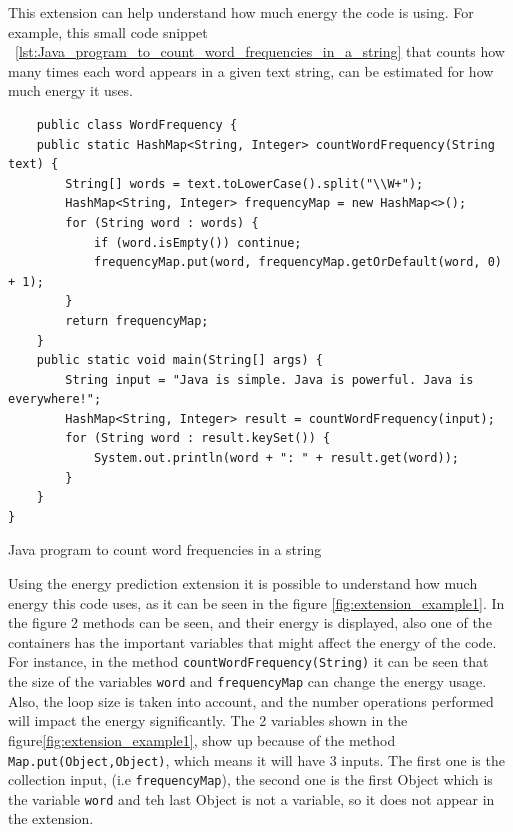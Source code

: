 This extension can help understand how much energy the code is using.
For example, this small code snippet ~\ref{lst:Java_program_to_count_word_frequencies_in_a_string} that counts how many times each word appears in a given text string, can be estimated for how much energy it uses.

\begin{listing}[H]
\begin{verbatim}
    public class WordFrequency {
    public static HashMap<String, Integer> countWordFrequency(String text) {
        String[] words = text.toLowerCase().split("\\W+");
        HashMap<String, Integer> frequencyMap = new HashMap<>();
        for (String word : words) {
            if (word.isEmpty()) continue; 
            frequencyMap.put(word, frequencyMap.getOrDefault(word, 0) + 1);
        }
        return frequencyMap;
    }
    public static void main(String[] args) {
        String input = "Java is simple. Java is powerful. Java is everywhere!";
        HashMap<String, Integer> result = countWordFrequency(input);
        for (String word : result.keySet()) {
            System.out.println(word + ": " + result.get(word));
        }
    }
}
\end{verbatim}
\caption{Java program to count word frequencies in a string}            
\label{lst:Java_program_to_count_word_frequencies_in_a_string}
\end{listing}

Using the energy prediction extension it is possible to understand how much energy this code uses, as it can be seen in the figure \ref{fig:extension_example1}.
In the figure 2 methods can be seen, and their energy is displayed, also one of the containers has the important variables that might affect the energy of the code. For instance, in the method \texttt{countWordFrequency(String)} it can be seen that the size of the variables \texttt{word} and \texttt{frequencyMap} can change the energy usage. Also, the loop size is taken into account, and the number operations performed will impact the energy significantly.
 The 2 variables shown in the figure\ref{fig:extension_example1}, show up because of the method \texttt{Map.put(Object,Object)}, which means it will have 3 inputs. The first one is the collection input, (i.e \texttt{frequencyMap}), the second one is the first Object which is the variable \texttt{word} and teh last Object is not a variable, so it does not appear in the extension.

